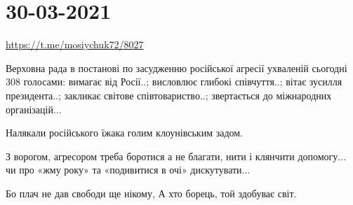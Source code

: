  
 
 
 
 
\section{30-03-2021}

\url{https://t.me/mosiychuk72/8027}

Верховна рада в постанові по засудженню російської агресії ухваленій сьогодні
308 голосами: вимагає від Росії..; висловлює глибокі співчуття..; вітає зусилля
президента..; закликає світове співтовариство..; звертається до міжнародних
організацій...

Налякали російського їжака голим клоунівським задом.

З ворогом, агресором треба боротися а не благати, нити і клянчити допомогу...
чи про «жму року» та «подивитися в очі» дискутувати...

Бо плач не дав свободи ще нікому, А хто борець, той здобуває світ.
